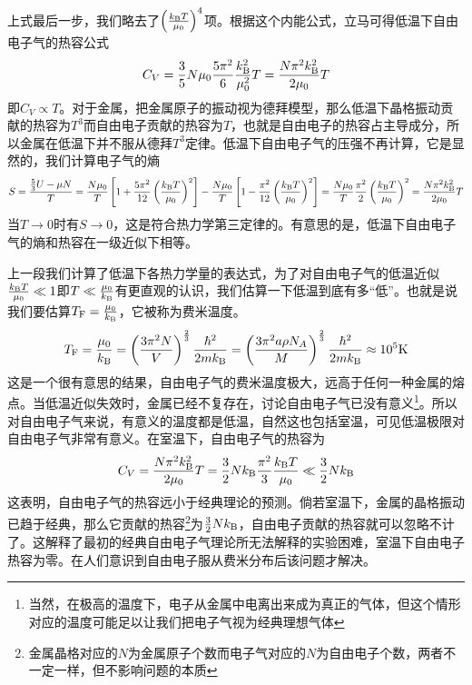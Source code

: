 \documentclass[../../main.tex]{subfiles}
\begin{document}
上式最后一步，我们略去了\(\left(\frac{k_{\mathrm{B}} T}{\mu_0}\right)^4\)项。根据这个内能公式，立马可得低温下自由电子气的热容公式
\begin{equation}
    C_V=\frac{3}{5}N\mu_0\frac{5\pi^2}{6}\frac{k_{\mathrm{B}}^2}{\mu_0^2}T=\frac{N\pi^2k_{\mathrm{B}}^2}{2\mu_0}T
\end{equation}
即\(C_V\propto T\)。对于金属，把金属原子的振动视为德拜模型，那么低温下晶格振动贡献的热容为\(T^3\)而自由电子贡献的热容为\(T\)，也就是自由电子的热容占主导成分，所以金属在低温下并不服从德拜\(T^3\)定律。低温下自由电子气的压强不再计算，它是显然的，我们计算电子气的熵
\begin{equation}
    S=\frac{\frac{5}{3}U-\mu N}{T}=\frac{N\mu_0}{T}\left[1+\frac{5\pi^2}{12}\left(\frac{k_{\mathrm{B}} T}{\mu_0}\right)^2\right]-\frac{N\mu_0}{T}\left[1-\frac{\pi^2}{12}\left(\frac{k_{\mathrm{B}} T}{\mu_0}\right)^2\right]=\frac{N\mu_0}{T}\frac{\pi^2}{2}\left(\frac{k_{\mathrm{B}} T}{\mu_0}\right)^2=\frac{N\pi^2k_{\mathrm{B}}^2}{2\mu_0}T
\end{equation}
当\(T\to 0\)时有\(S\to 0\)，这是符合热力学第三定律的。有意思的是，低温下自由电子气的熵和热容在一级近似下相等。

上一段我们计算了低温下各热力学量的表达式，为了对自由电子气的低温近似\(\frac{k_{\mathrm{B}} T}{\mu_0}\ll 1\)即\(T\ll\frac{\mu_0}{k_{\mathrm{B}}}\)有更直观的认识，我们估算一下低温到底有多“低”。也就是说我们要估算\(T_{\mathrm{F}}=\frac{\mu_0}{k_{\mathrm{B}}}\)，它被称为费米温度。
\begin{equation}
    T_{\mathrm{F}}=\frac{\mu_0}{k_{\mathrm{B}}}=\left(\frac{3\pi^2N}{V}\right)^{\frac{2}{3}}\frac{\hbar^2}{2mk_{\mathrm{B}}}=\left(\frac{3\pi^2a\rho N_A}{M}\right)^{\frac{2}{3}}\frac{\hbar^2}{2mk_{\mathrm{B}}}\approx 10^{5}\mathrm{K}
\end{equation}
这是一个很有意思的结果，自由电子气的费米温度极大，远高于任何一种金属的熔点。当低温近似失效时，金属已经不复存在，讨论自由电子气已没有意义\footnote{当然，在极高的温度下，电子从金属中电离出来成为真正的气体，但这个情形对应的温度可能足以让我们把电子气视为经典理想气体}。所以对自由电子气来说，有意义的温度都是低温，自然这也包括室温，可见低温极限对自由电子气非常有意义。在室温下，自由电子气的热容为
\begin{equation}
    C_V=\frac{N\pi^2k_{\mathrm{B}}^2}{2\mu_0}T=\frac{3}{2}Nk_{\mathrm{B}} \frac{\pi^2}{3}\frac{k_{\mathrm{B}} T}{\mu_0}\ll \frac{3}{2}Nk_{\mathrm{B}}
\end{equation}
这表明，自由电子气的热容远小于经典理论的预测。倘若室温下，金属的晶格振动已趋于经典，那么它贡献的热容\footnote{金属晶格对应的\(N\)为金属原子个数而电子气对应的\(N\)为自由电子个数，两者不一定一样，但不影响问题的本质}为\(\frac{3}{2}Nk_{\mathrm{B}}\)，自由电子贡献的热容就可以忽略不计了。这解释了最初的经典自由电子气理论所无法解释的实验困难，室温下自由电子热容为零。在人们意识到自由电子服从费米分布后该问题才解决。
\end{document}

